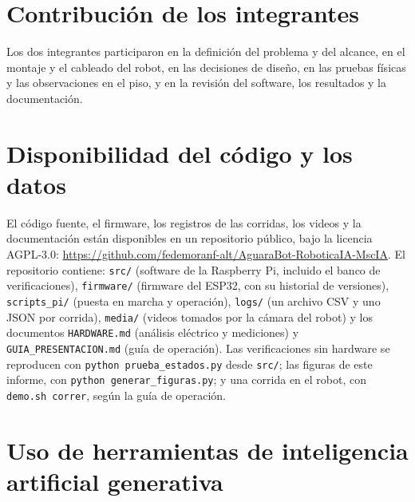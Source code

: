 \documentclass[pdflatex,sn-mathphys-num]{sn-jnl}
\newcommand{\cod}[1]{\texttt{#1}}
\begin{document}
\section*{Contribuci\'on de los integrantes}

Los dos integrantes participaron en la definici\'on del problema y del
alcance, en el montaje y el cableado del robot, en las decisiones de dise\~no,
en las pruebas f\'isicas y las observaciones en el piso, y en la revisi\'on del
software, los resultados y la documentaci\'on.

\section*{Disponibilidad del c\'odigo y los datos}

El c\'odigo fuente, el firmware, los registros de las corridas, los videos y
la documentaci\'on est\'an disponibles en un repositorio p\'ublico, bajo la
licencia AGPL-3.0:
\url{https://github.com/fedemoranf-alt/AguaraBot-RoboticaIA-MscIA}. El
repositorio contiene:
\cod{src/} (software de la Raspberry Pi, incluido el banco de
verificaciones), \cod{firmware/} (firmware del ESP32, con su historial de
versiones), \cod{scripts\_pi/} (puesta en marcha y operaci\'on), \cod{logs/}
(un archivo CSV y uno JSON por corrida), \cod{media/} (videos tomados por la
c\'amara del robot) y los documentos \cod{HARDWARE.md} (an\'alisis
el\'ectrico y mediciones) y \cod{GUIA\_PRESENTACION.md} (gu\'ia de
operaci\'on). Las
verificaciones sin hardware se reproducen con \cod{python
prueba\_estados.py} desde \cod{src/}; las figuras de este informe, con
\cod{python generar\_figuras.py}; y una corrida en el robot, con
\cod{demo.sh correr}, seg\'un la gu\'ia de operaci\'on.

\section*{Uso de herramientas de inteligencia artificial generativa}
\end{document}
